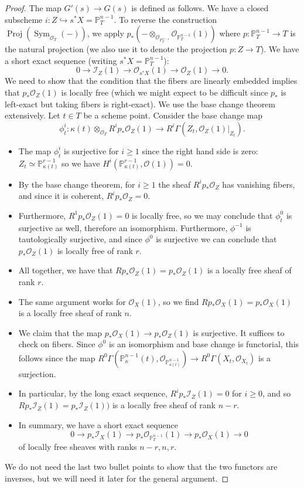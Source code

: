 \documentclass[10pt]{article}
\theoremstyle{definition}
\DeclareMathOperator{\Sym}{Sym}
\DeclareMathOperator{\Proj}{Proj}
\newcommand{\PP}{\mathbb{P}}
\newcommand{\OO}{\mathcal{O}}
\begin{document}
\begin{proof}
The map $G'(s) \rightarrow G(s)$ is defined as follows.  We have a closed subscheme $i: Z \hookrightarrow s^*X = \mathbb{P}^{n-1}_T$.  To reverse the construction $\Proj(\Sym_{\OO_T}(-))$, we apply $p_*(- \otimes_{\OO_{\PP^{n-1}_T}} \OO_{\PP^{n-1}_T}(1))$ where $p: \PP^{n-1}_T \rightarrow T$ is the natural projection (we also use it to denote the projection $p: Z \rightarrow T$).  We have a short exact sequence (writing $s^*X = \PP^{n-1}_T$):
$$0 \rightarrow \mathcal{I}_Z(1) \rightarrow \OO_{s^*X}(1) \rightarrow \OO_Z(1) \rightarrow 0.$$
We need to show that the condition that the fibers are linearly embedded implies that $p_* \OO_Z(1)$ is locally free (which we might expect to be difficult since $p_*$ is left-exact but taking fibers is right-exact).  We use the base change theorem extensively.  Let $t \in T$ be a scheme point.  Consider the base change map
$$\phi^i_t: \kappa(t) \otimes_{\OO_T} R^ip_* \OO_Z(1) \rightarrow R^i\Gamma(Z_t, \OO_Z(1)|_{Z_t}).$$
\begin{itemize}
\item The map $\phi^i_t$ is surjective for $i \geq 1$ since the right hand side is zero: $Z_t \simeq \mathbb{P}^{r-1}_{\kappa(t)}$ so we have $H^i(\PP^{r-1}_{\kappa(t)}, \OO(1)) = 0$.
\item By the base change theorem, for $i \geq 1$ the sheaf $R^ip_*\OO_Z$ has vanishing fibers, and since it is coherent, $R^ip_*\OO_Z = 0$.
\item Furthermore, $R^1p_* \OO_Z(1) = 0$ is locally free, so we may conclude that $\phi^0_t$ is surjective as well, therefore an isomorphism.  Furthermore, $\phi^{-1}$ is tautologically surjective, and since $\phi^0$ is surjective we can conclude that $p_* \OO_Z(1)$ is locally free of rank $r$.
\item All together, we have that $Rp_* \OO_Z(1) = p_* \OO_Z(1)$ is a locally free sheaf of rank $r$.
\item The same argument works for $\OO_X(1)$, so we find $Rp_*\OO_X(1) = p_* \OO_X(1)$ is a locally free sheaf of rank $n$.
\item We claim that the map $p_* \OO_X(1) \rightarrow p_* \OO_Z(1)$ is surjective.  It suffices to check on fibers.  Since $\phi^0$ is an isomorphism and base change is functorial, this follows since the map $R^0\Gamma(\mathbb{P}^{n-1}_\kappa(t), \OO_{\PP^{n-1}_{\kappa(t)}}) \rightarrow R^0\Gamma(X_t, \OO_{X_t})$ is a surjection.
\item In particular, by the long exact sequence, $R^ip_* \mathcal{I}_Z(1) = 0$ for $i \geq 0$, and so $Rp_* \mathcal{I}_Z(1) = p_*\mathcal{I}_Z(1))$ is a locally free sheaf of rank $n-r$.
\item In summary, we have a short exact sequence
$$0 \rightarrow p_* \mathcal{I}_X(1) \rightarrow p_* \OO_{\PP^{n-1}_T}(1) \rightarrow p_* \OO_X(1) \rightarrow 0$$
of locally free sheaves with ranks $n-r, n, r$.
\end{itemize}
We do not need the last two bullet points to show that the two functors are inverses, but we will need it later for the general argument.
\end{proof}
\end{document}
